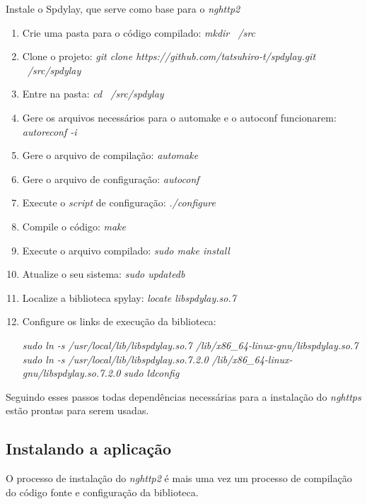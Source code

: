 \begin{apendicesenv}
Instale o Spdylay, que serve como base para o \textit{nghttp2}
\begin{enumerate}
	\item Crie uma pasta para o código compilado: \textit{mkdir ~/src}
	\item Clone o projeto: \textit{git clone https://github.com/tatsuhiro-t/spdylay.git ~/src/spdylay}
	\item Entre na pasta: \textit{cd ~/src/spdylay}
	\item Gere os arquivos necessários para o automake e o autoconf funcionarem: \textit{autoreconf -i}
	\item Gere o arquivo de compilação: \textit{automake}
	\item Gere o arquivo de configuração: \textit{autoconf}
	\item Execute o \textit{script} de configuração: \textit{./configure}
	\item Compile o código: \textit{make}
	\item Execute o arquivo compilado: \textit{sudo make install}
	\item Atualize o seu sistema: \textit{sudo updatedb}
	\item Localize a biblioteca spylay: \textit{locate libspdylay.so.7}
	\item Configure os links de execução da biblioteca:
		\begin{center}
			\textit{sudo ln -s /usr/local/lib/libspdylay.so.7 /lib/x86\_64-linux-gnu/libspdylay.so.7}
			\textit{sudo ln -s /usr/local/lib/libspdylay.so.7.2.0 /lib/x86\_64-linux-gnu/libspdylay.so.7.2.0}
			\textit{sudo ldconfig}
		\end{center}
\end{enumerate}

Seguindo esses passos todas dependências necessárias para a instalação do \textit{nghttps} estão prontas para serem usadas.

\subsection{Instalando a aplicação}
O processo de instalação do \textit{nghttp2} é mais uma vez um processo de compilação do código fonte e configuração da biblioteca.


\end{apendicesenv}
